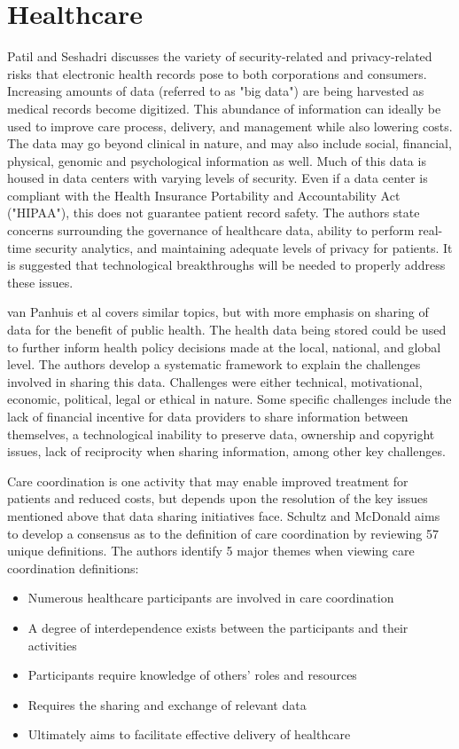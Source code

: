 \documentclass[12pt]{report}
\begin{document}
\section{Healthcare}
Patil and Seshadri \cite{KupwadePatil.2014} discusses the variety of security-related and privacy-related risks that electronic health records pose to both corporations and consumers. Increasing amounts of data (referred to as "big data") are being harvested as medical records become digitized. This abundance of information can ideally be used to improve care process, delivery, and management while also lowering costs. The data may go beyond clinical in nature, and may also include social, financial, physical, genomic and psychological information as well. Much of this data is housed in data centers with varying levels of security. Even if a data center is compliant with the Health Insurance Portability and Accountability Act ("HIPAA"), this does not guarantee patient record safety. The authors state concerns surrounding the governance of healthcare data, ability to perform real-time security analytics, and maintaining adequate levels of privacy for patients. It is suggested that technological breakthroughs will be needed to properly address these issues.

van Panhuis et al \cite{vanPanhuis.2014} covers similar topics, but with more emphasis on sharing of data for the benefit of public health. The health data being stored could be used to further inform health policy decisions made at the local, national, and global level. The authors develop a systematic framework to explain the challenges involved in sharing this data. Challenges were either technical, motivational, economic, political, legal or ethical in nature. Some specific challenges include the lack of financial incentive for data providers to share information between themselves, a technological inability to preserve data, ownership and copyright issues, lack of reciprocity when sharing information, among other key challenges.

Care coordination is one activity that may enable improved treatment for patients and reduced costs, but depends upon the resolution of the key issues mentioned above that data sharing initiatives face. Schultz and McDonald \cite{Schultz.2014} aims to develop a consensus as to the definition of care coordination by reviewing 57 unique definitions. The authors identify 5 major themes when viewing care coordination definitions:

\begin{itemize}
\item Numerous healthcare participants are involved in care coordination
\item A degree of interdependence exists between the participants and their activities
\item Participants require knowledge of others' roles and resources
\item Requires the sharing and exchange of relevant data
\item Ultimately aims to facilitate effective delivery of healthcare
\end{itemize}
\end{document}
